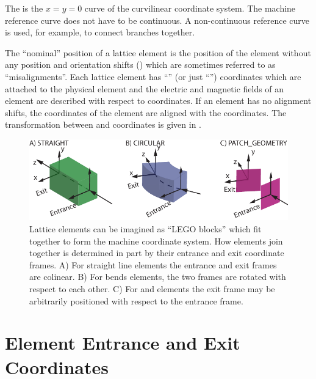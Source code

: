 The  is the $x = y = 0$ curve of the curvilinear coordinate
system. The machine reference curve does not have to be continuous. A non-continuous
reference curve is used, for example, to connect branches together. 

The ``nominal'' position of a lattice element is the position of the element without any
position and orientation shifts () 
which are sometimes referred to as ``misalignments''. 
Each lattice element has ``'' (or just ``'') 
coordinates which are attached to the physical element and the electric and magnetic
fields of an element are described with respect to  coordinates.  
If an element has no
alignment shifts, the  coordinates of the element are aligned with the 
 coordinates.
The transformation between  and  coordinates is given in
.


  \begin{figure}[tb]
  \centering
  \includegraphics[width=5in]{ele-coord-frame.pdf}
\caption[Lattice elements as LEGO blocks.]{Lattice elements can be imagined as ``LEGO blocks'' which
fit together to form the machine coordinate system. How elements
join together is determined in part by their entrance and exit coordinate frames. A) For
straight line elements the entrance and exit frames are colinear. B) For bends elements, the two
frames are rotated with respect to each other. C) For  and  elements the
exit frame may be arbitrarily positioned with respect to the entrance frame.}
  \label{f:ele.coord.frame}
  \end{figure}


\section{Element Entrance and Exit Coordinates}
\label{s:ent.exi}

